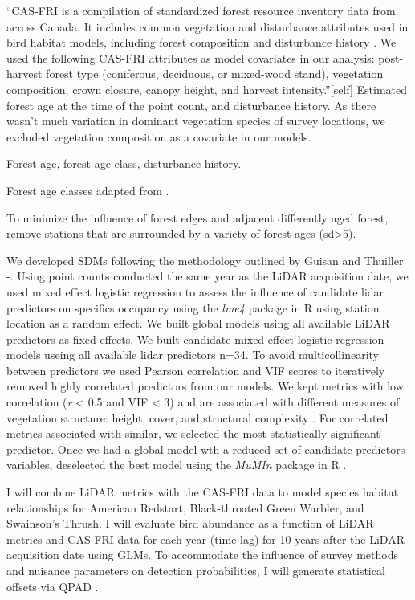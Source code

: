 \documentclass[manuscript, 3p,
authoryear]{elsarticle} %
\begin{document}
``CAS-FRI is a compilation of standardized forest resource inventory
data from across Canada. It includes common vegetation and disturbance
attributes used in bird habitat models, including forest composition and
disturbance history \citep{Cumming2011a}. We used the following CAS-FRI
attributes as model covariates in our analysis: post-harvest forest type
(coniferous, deciduous, or mixed-wood stand), vegetation composition,
crown closure, canopy height, and harvest intensity.''{[}self{]}
Estimated forest age at the time of the point count, and disturbance
history. As there wasn't much variation in dominant vegetation species
of survey locations, we excluded vegetation composition as a covariate
in our models.

Forest age, forest age class, disturbance history.

Forest age classes adapted from \citet{chen2002dynamics}.

To minimize the influence of forest edges and adjacent differently aged
forest, remove stations that are surrounded by a variety of forest ages
(sd\textgreater5).

We developed SDMs following the methodology outlined by Guisan and
Thuiller -\citet{Guisan2005}. Using point counts conducted the same year
as the LiDAR acquisition date, we used mixed effect logistic regression
to assess the influence of candidate lidar predictors on specifics
occupancy using the \emph{lme4} package in
R\citep{batesFittingLinearMixedeffects2015} using station location as a
random effect. We built global models using all available LiDAR
predictors as fixed effects. We built candidate mixed effect logistic
regression models useing all available lidar predictors n=34. To avoid
multicollinearity between predictors we used Pearson correlation and VIF
scores to iteratively removed highly correlated predictors from our
models. We kept metrics with low correlation (\emph{r} \textless{} 0.5
and VIF \textless{} 3) and are associated with different measures of
vegetation structure: height, cover, and structural complexity
\citep{valbuenaStandardizingEcosystemMorphological2020}. For correlated
metrics associated with similar, we selected the most statistically
significant predictor. Once we had a global model wth a reduced set of
candidate predictors variables, deselected the best model using the
\emph{MuMIn} package in R \citet{bartonMuMInMultimodelInference2020}.

I will combine LiDAR metrics with the CAS-FRI data to model species
habitat relationships for American Redstart, Black-throated Green
Warbler, and Swainson's Thrush. I will evaluate bird abundance as a
function of LiDAR metrics and CAS-FRI data \citep{MacKenzie2006} for
each year (time lag) for 10 years after the LiDAR acquisition date using
GLMs. To accommodate the influence of survey methods and nuisance
parameters on detection probabilities, I will generate statistical
offsets via QPAD \citep{SolymosMatsuoka2013}.
\end{document}
